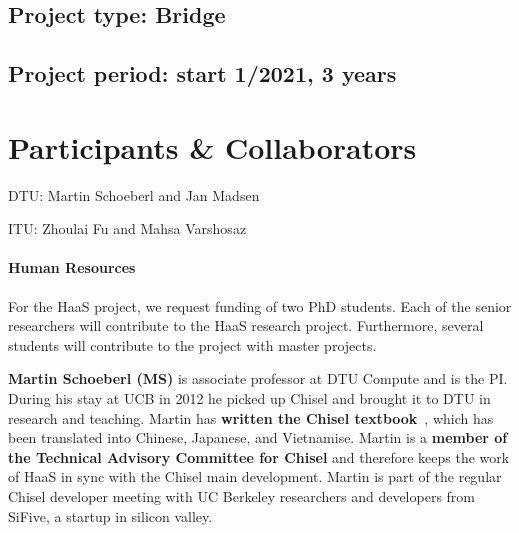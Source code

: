 \documentclass[fleqn,12pt]{article}
\begin{document}
\subsection*{Project type: Bridge}

\subsection*{Project period: start 1/2021, 3 years}

\section*{Participants \& Collaborators}

\noindent DTU: Martin Schoeberl and Jan Madsen

\noindent ITU: Zhoulai Fu and Mahsa Varshosaz

\paragraph*{Human Resources}

For the HaaS project, we request funding of two PhD students.
Each of the senior researchers will contribute to the HaaS research project.
Furthermore, several students will contribute to the project with
master projects.
%
%


{\bf Martin Schoeberl (MS)} is associate professor at DTU Compute and is the PI.
During his stay
at UCB in 2012 he picked up Chisel and brought it to DTU in research and teaching.
Martin has {\bf written the Chisel textbook}~\cite{chisel:book}, which has been translated
into Chinese, Japanese, and Vietnamise. Martin is a {\bf member of the Technical Advisory Committee for
Chisel} and therefore keeps the work of HaaS in sync with the Chisel main development.
Martin is part of the regular Chisel developer meeting with
UC Berkeley researchers and developers from SiFive, a startup in silicon valley.
\end{document}
